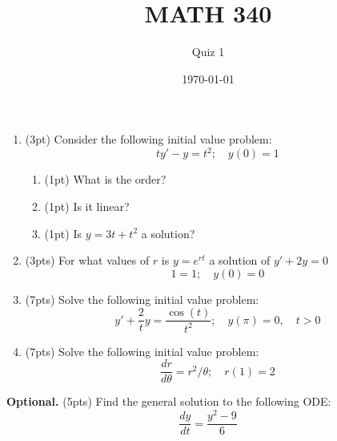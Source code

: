 \documentclass{article}
\begin{document}
\title{MATH 340}
\author{Quiz 1}
\date{\today}
\maketitle

\begin{enumerate}
	\item (3pt) Consider the following initial value problem:
	\[ty'-y=t^2;\quad y(0)=1\]
\begin{enumerate}
	\item (1pt) What is the order?
	\item (1pt) Is it linear?
	\item (1pt) Is $y=3t+t^2$ a solution?
\end{enumerate}
\vspace{2cm}
\item (3pts) For what values of $r$ is $y=e^{rt}$ a solution of $y'+2y=0$
	\[1=1;\quad y(0)=0\]
\vspace{3cm}
\item (7pts) Solve the following initial value problem:
	\[y'+\frac{2}{t}y=\frac{\cos(t)}{t^2};\quad y(\pi)=0,\quad t>0\]
\newpage
\vspace{4cm}
\item (7pts) Solve the following initial value problem:
	\[\frac{dr}{d\theta}=r^2/\theta;\quad r(1)=2\]
\end{enumerate}
\vspace{12cm}
\textbf{Optional.} (5pts) Find the general solution to the following ODE:
	\[\frac{dy}{dt}=\frac{y^2-9}{6}\]
\end{document}
